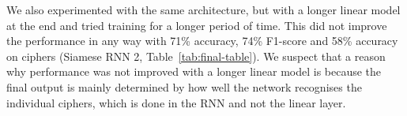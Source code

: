 \documentclass[10pt,conference,compsocconf]{IEEEtran}
\begin{document}


We also experimented with the same architecture, but with a longer linear model at the end and tried training for a longer period of time. This did not improve the performance in any way  with 71\% accuracy, 74\% F1-score and 58\% accuracy on ciphers (Siamese RNN 2, Table~\ref{tab:final-table}). We suspect that a reason why performance was not improved with a longer linear model is because the final output is mainly determined by how well the network recognises the individual ciphers, which is done in the RNN and not the linear layer.
\end{document}
